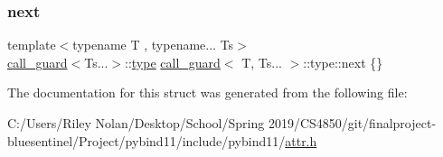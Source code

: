 \subsubsection{\texorpdfstring{next}{next}}
{\footnotesize\ttfamily template$<$typename T , typename... Ts$>$ \\
\mbox{\hyperlink{structcall__guard}{call\+\_\+guard}}$<$Ts...$>$\+::\mbox{\hyperlink{_s_d_l__opengl_8h_ad5ddf6fca7b585646515660e810e0188}{type}} \mbox{\hyperlink{structcall__guard}{call\+\_\+guard}}$<$ T, Ts... $>$\+::type\+::next \{\}}



The documentation for this struct was generated from the following file\+:\begin{DoxyCompactItemize}
\item 
C\+:/\+Users/\+Riley Nolan/\+Desktop/\+School/\+Spring 2019/\+C\+S4850/git/finalproject-\/bluesentinel/\+Project/pybind11/include/pybind11/\mbox{\hyperlink{attr_8h}{attr.\+h}}\end{DoxyCompactItemize}
